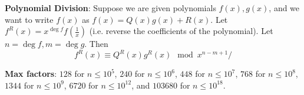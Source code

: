 \textbf{Polynomial Division}: Suppose we are given polynomials $f(x), g(x)$, and we want to write $f(x)$ as $f(x) = Q(x)g(x) + R(x)$. Let $f^R(x) = x^{\deg f}f(\frac{1}{x})$ (i.e. reverse the coefficients of the polynomial). Let $n = \deg f, m = \deg g$. Then
\begin{equation*}
  f^R(x) \equiv Q^R(x) g^R(x) \mod x^{n-m+1}/
\end{equation*}

\textbf{Max factors}: $128$ for $n \le 10^5$, $240$ for $n \le 10^6$, $448$ for $n \le 10^7$, $768$ for $n \le 10^8$, $1344$ for $n \le 10^9$, $6720$ for $n \le 10^{12}$, and $103680$ for $n \le 10^{18}.$
